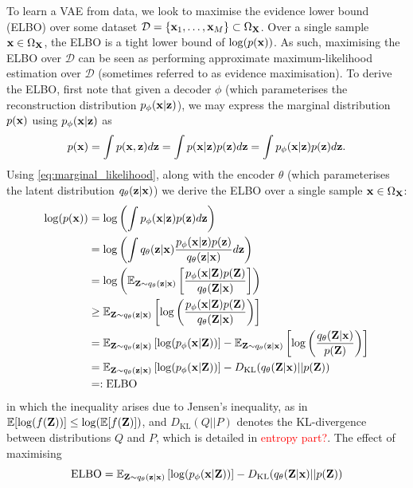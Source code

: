 \documentclass[11pt]{article}
\begin{document}
To learn a VAE from data, we look to maximise the evidence lower bound (ELBO) over some dataset $\mathcal{D}=\{\mathbf{x}_1,\dots,\mathbf{x}_M\}\subset\Omega_{\mathbf{X}}$. Over a single sample $\mathbf{x}\in\Omega_{\mathbf{X}}$, the ELBO is a tight lower bound of $\log(p(\mathbf{x}))$. As such, maximising the ELBO over $\mathcal{D}$ can be seen as performing approximate maximum-likelihood estimation over $\mathcal{D}$ (sometimes referred to as evidence maximisation). To derive the ELBO, first note that given a decoder $\phi$ (which parameterises the reconstruction distribution $p_{\phi}(\mathbf{x}|\mathbf{z})$), we may express the marginal distribution $p(\mathbf{x})$ using $p_{\phi}(\mathbf{x}|\mathbf{z})$ as
\begin{equation}
\label{eq:marginal_likelihood}
p(\mathbf{x})
=
\int p(\mathbf{x},\mathbf{z})d\mathbf{z}
=
\int p(\mathbf{x}|\mathbf{z})p(\mathbf{z})d\mathbf{z}
=
\int p_{\phi}(\mathbf{x}|\mathbf{z})p(\mathbf{z})d\mathbf{z}.
\end{equation}
Using \autoref{eq:marginal_likelihood}, along with the encoder $\theta$ (which parameterises the latent distribution $q_{\theta}(\mathbf{z}|\mathbf{x})$) we derive the ELBO over a single sample $\mathbf{x}\in\Omega_{\mathbf{X}}$:
\begin{align*}
    \log(p(\mathbf{x}))
    &=
    \log\left(\int p_{\phi}(\mathbf{x}|\mathbf{z})p(\mathbf{z})d\mathbf{z}\right)\\
    &=
    \log\left(\int q_{\theta}(\mathbf{z}|\mathbf{x})\frac{p_{\phi}(\mathbf{x}|\mathbf{z})p(\mathbf{z})}{q_{\theta}(\mathbf{z}|\mathbf{x})}d\mathbf{z}\right)\\
    &=
    \log\left(\mathbb{E}_{\mathbf{Z}\sim q_{\theta}(\mathbf{z}|\mathbf{x})}\left[\frac{p_{\phi}(\mathbf{x}|\mathbf{Z})p(\mathbf{Z})}{q_{\theta}(\mathbf{Z}|\mathbf{x})}\right]\right)\\
    &\geq
    \mathbb{E}_{\mathbf{Z}\sim q_{\theta}(\mathbf{z}|\mathbf{x})}\left[\log\left(\frac{p_{\phi}(\mathbf{x}|\mathbf{Z})p(\mathbf{Z})}{q_{\theta}(\mathbf{Z}|\mathbf{x})}\right)\right]\\
    &=
    \mathbb{E}_{\mathbf{Z}\sim q_{\theta}(\mathbf{z}|\mathbf{x})}\left[\log(p_{\phi}(\mathbf{x}|\mathbf{Z}))\right]-\mathbb{E}_{\mathbf{Z}\sim q_{\theta}(\mathbf{z}|\mathbf{x})}\left[\log\left(\frac{q_{\theta}(\mathbf{Z}|\mathbf{x})}{p(\mathbf{Z})}\right)\right]\\
    &=
    \mathbb{E}_{\mathbf{Z}\sim q_{\theta}(\mathbf{z}|\mathbf{x})}\left[\log(p_{\phi}(\mathbf{x}|\mathbf{Z}))\right]-D_{\text{KL}}(q_{\theta}(\mathbf{Z}|\mathbf{x})||p(\mathbf{Z}))\\
    &=:
    \text{ELBO}
\end{align*}
in which the inequality arises due to Jensen's inequality, as in $\mathbb{E}[\log(f(\mathbf{Z}))]\leq\log(\mathbb{E}[f(\mathbf{Z})])$, and $D_\text{KL}(Q||P)$ denotes the KL-divergence between distributions $Q$ and $P$, which is detailed in \textcolor{red}{entropy part?}. The effect of maximising
$$
\text{ELBO}
=
\mathbb{E}_{\mathbf{Z}\sim q_{\theta}(\mathbf{z}|\mathbf{x})}\left[\log(p_{\phi}(\mathbf{x}|\mathbf{Z}))\right]-D_{\text{KL}}(q_{\theta}(\mathbf{Z}|\mathbf{x})||p(\mathbf{Z}))
$$
\end{document}
